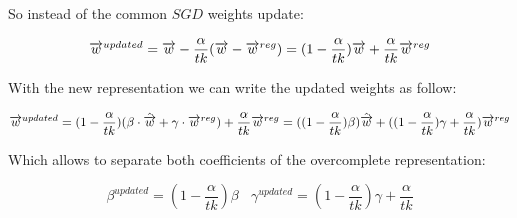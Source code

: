 So instead of the common $SGD$ weights update:

\begin{equation}
\\ \overrightarrow{w}^{updated} = \overrightarrow{w} - \frac{\alpha}{tk}(
\overrightarrow{w} - \overrightarrow{w}^{reg})
\\ \\= (1-\frac{\alpha}{tk})\overrightarrow{w} + \frac{\alpha}{tk}\overrightarrow{w}^{reg}
\end{equation}

With the new representation we can write the updated weights as follow:

\begin{equation}
\\ \overrightarrow{w}^{updated} = (1-\frac{\alpha}{tk})(\beta \cdot \hat{\overrightarrow{w}} + \gamma \cdot \overrightarrow{w}^{reg}) +  \frac{\alpha}{tk}\overrightarrow{w}^{reg}
\\\\= ((1-\frac{\alpha}{tk})\beta)\hat{\overrightarrow{w}} + 
((1-\frac{\alpha}{tk})\gamma
+\frac{\alpha}{tk})\overrightarrow{w}^{reg}
\end{equation}

Which allows to separate both coefficients of the overcomplete representation:

\begin{equation}
\beta^{updated} = (1-\frac{\alpha}{tk})\beta \:\:\:\: \gamma^{updated} = (1-\frac{\alpha}{tk})\gamma+\frac{\alpha}{tk}
\end{equation}


